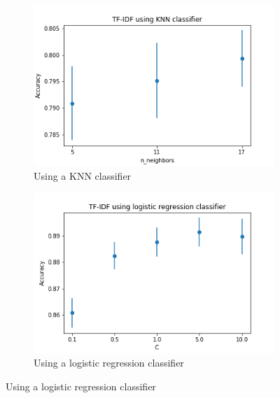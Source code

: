 \documentclass{article}
\begin{document}
	\begin{figure}
        \centering
        \begin{subfigure}[b]{0.5\textwidth}
            \includegraphics[width=\textwidth]{tf-idf-knn.png}
            \caption{Using a KNN classifier}
            \label{fig:tf-idf-knn}
        \end{subfigure}
        \begin{subfigure}[b]{0.5\textwidth}
            \includegraphics[width=\textwidth]{tf-idf-lr.png}
            \caption{Using a logistic regression classifier}
            \label{fig:tf-idf-lr}
        \end{subfigure}
        

\end{figure}
\end{document}
